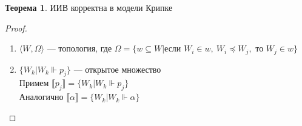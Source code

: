 \documentclass[english]{article}
\theoremstyle{plain}
\theoremstyle{remark}
\theoremstyle{definition}
\newtheorem{theorem}{Теорема}[section]
\begin{document}
\begin{theorem}
ИИВ корректна в модели Крипке
\end{theorem}
\begin{proof}
\begin{enumerate}
\item \(\langle W, \Omega \rangle\) --- топология, где \(\Omega = \{w \subseteq W | \text{если }W_i \in w,\ W_i \preceq W_j,\text{ то } W_j \in w\}\) \\
\item \(\{W_k | W_k \Vdash p_j\}\) --- открытое множество \\
Примем \(\llbracket p_j \rrbracket = \{W_k | W_k \Vdash p_j\}\) \\
Аналогично \(\llbracket \alpha \rrbracket = \{W_k | W_k \Vdash \alpha\}\)
\end{enumerate}
\end{proof}
\end{document}
